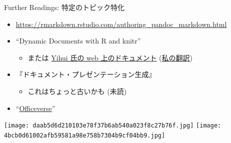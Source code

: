 \documentclass[
  ignorenonframetext,
]{beamer}
\providecommand{\tightlist}{%
  \setlength{\itemsep}{0pt}\setlength{\parskip}{0pt}}
\begin{document}
\begin{frame}{Further Readings: 特定のトピック特化}
\protect\hypertarget{further-readings-ux7279ux5b9aux306eux30c8ux30d4ux30c3ux30afux7279ux5316}{}
\begin{itemize}
\item
  \url{https://rmarkdown.rstudio.com/authoring_pandoc_markdown.html}
\item
  ``Dynamic Documents with R and knitr'' \autocite{xie2015Dynamic}

  \begin{itemize}
  \tightlist
  \item
    または \href{https://yihui.org/knitr/}{Yihui 氏の web
    上のドキュメント}
    (\href{https://gedevan-aleksizde.github.io/knitr-doc-ja/index.html}{私の翻訳})
  \end{itemize}
\item
  『ドキュメント・プレゼンテーション生成』\autocite{KinTakahashi2014}

  \begin{itemize}
  \tightlist
  \item
    これはちょっと古いかも (未読)
  \end{itemize}
\item
  ``\href{https://ardata-fr.github.io/officeverse/}{Officeverse}''
\end{itemize}

\begin{center}

\texttt{[image: daab5d6d210103e78f37b6ab540a023f8c27b76f.jpg]}
\texttt{[image: 4bcb0d61002afb59581a98e758b7304b9cf04bb9.jpg]}

\end{center}
\end{frame}
\end{document}
